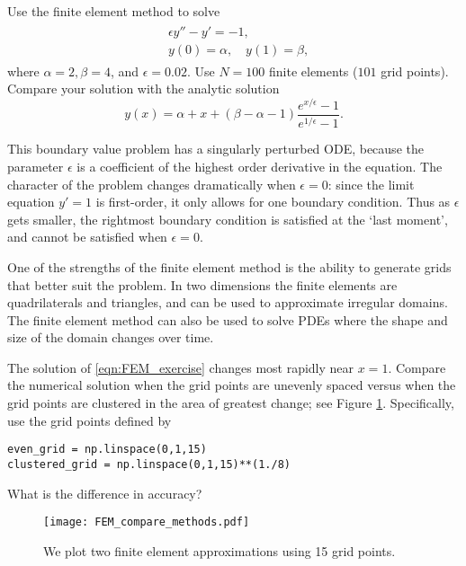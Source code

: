 \begin{problem}
Use the finite element method to solve
\begin{align}
	\begin{split}
	&{ }\epsilon y'' - y' = -1,\\
	&{ }y(0) = \alpha, \quad y(1) = \beta,
	\end{split} \label{eqn:FEM_exercise}
\end{align}
where $\alpha = 2, \beta = 4$, and $\epsilon = 0.02$.
Use $N = 100$ finite elements ($101$ grid points).
Compare your solution with the analytic solution
\[y(x) = \alpha + x + (\beta - \alpha - 1 ) \frac{e^{x/\epsilon} -1}{e^{1/\epsilon} -1}.\]

This boundary value problem has a singularly perturbed ODE, because the parameter $\epsilon$ is a coefficient of the highest order derivative in the equation.
The character of the problem changes dramatically when $\epsilon = 0$: since the limit equation $y' = 1$ is first-order, it only allows for one boundary condition.
Thus as $\epsilon$ gets smaller, the rightmost boundary condition is satisfied at the `last moment',  and cannot be satisfied when $\epsilon = 0$.
\end{problem}

\begin{problem}
One of the strengths of the finite element method is the ability to generate grids that better suit the problem.
In two dimensions the finite elements are quadrilaterals and triangles, and can be used to approximate irregular domains.
The finite element method can also be used to solve PDEs where the shape and size of the domain changes over time.

The solution of \eqref{eqn:FEM_exercise} changes most rapidly near $x = 1$.
Compare the numerical solution when the grid points are unevenly spaced versus when the grid points are clustered in the area of greatest change; see Figure \ref{fig:FEM_compare_methods}. Specifically, use the grid points defined by
\begin{lstlisting}
even_grid = np.linspace(0,1,15)
clustered_grid = np.linspace(0,1,15)**(1./8)
\end{lstlisting}
What is the difference in accuracy?
\end{problem}

\begin{figure}[ht]
\centering
\texttt{[image: FEM\_compare\_methods.pdf]}
\caption{We plot two finite element approximations using 15 grid points. }
\label{fig:FEM_compare_methods}
\end{figure}

